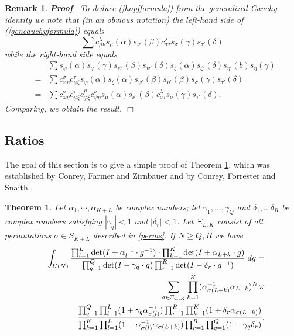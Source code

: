 \documentclass[11pt]{amsart}
\renewenvironment{proof}{
\noindent\textbf{Proof}\ }{\hspace*{\fill}
\begin{math}\Box\end{math}\medskip}
\newtheorem{theorem}{Theorem}
\newtheorem{varremark}{Remark}
\newenvironment{remark}{\begin{varremark}\em}{\em\end{varremark}}
\begin{document}
\begin{remark}
\begin{proof}
To deduce (\ref{hopfformula}) from the generalized Cauchy identity
we note that (in an obvious notation) the left-hand side of
(\ref{gencauchyformula}) equals
\[ \sum c_{\mu \nu}^{\lambda} s_{\mu} ( \alpha ) s_{\nu'} ( \beta )
    c^{\lambda}_{\sigma \tau} s_{\sigma} ( \gamma ) s_{\tau'} ( \delta ) \]
while the right-hand side equals
\begin{eqnarray*}
   &  & \sum s_{\varphi} ( \alpha ) s_{\varphi} ( \gamma ) s_{\psi'} ( \beta
   ) s_{\psi'} ( \delta ) s_{\xi} ( \alpha ) s_{\xi'} ( \delta ) s_{\eta'} (
   b ) s_{\eta} ( \gamma )_{}\\
   & = & \sum c_{\varphi \eta}^{\sigma} c^{\tau}_{\psi \xi} s_{\varphi} (
   \alpha ) s_{\xi} ( \alpha ) s_{\psi'} ( \beta ) s_{\eta'} ( \beta )
   s_{\sigma} ( \gamma ) s_{\tau'} ( \delta )\\
   & = & \sum c_{\varphi \eta}^{\sigma} c^{\tau}_{\psi \xi} c_{\varphi
   \xi}^{\mu} c_{\psi \eta}^{\nu} s_{\mu} ( \alpha ) s_{\nu'} ( \beta )
   c^{\lambda}_{\sigma \tau} s_{\sigma} ( \gamma ) s_{\tau'} ( \delta ) .
\end{eqnarray*}
Comparing, we obtain the result.
\end{proof}
\end{remark}


\subsection{Ratios}
The goal of this section is to give a simple proof of Theorem
\ref{t:1}, which was established by Conrey, Farmer and Zirnbauer
\cite{cfz} and by Conrey, Forrester and Snaith \cite{cfs}.

\begin{theorem} \label{t:1}
Let $\alpha_1, \cdots, \alpha_{K+L}$ be complex numbers; let
$\gamma_1, \dots, \gamma_Q$ and $\delta_1, \dots \delta_R$ be
complex numbers satisfying $|\gamma_q| < 1$ and $|\delta_r| < 1$.
Let $\Xi_{L, K}$ consist of all permutations $\sigma \in S_{K +
L}$ described in \eqref{perms}. If $N \geqslant Q, R$ we have
\begin{eqnarray}
   &  & \int_{U ( N )} \frac{\prod_{l = 1}^L \det ( I + \alpha_l^{- 1} \cdot
   g^{- 1} ) \cdot \prod_{k = 1}^K \det ( I + \alpha_{L + k} \cdot g
   )}{\prod_{q = 1}^Q \det ( I - \gamma_q \cdot g ) \prod_{r = 1}^R \det ( I
   - \delta_r \cdot g^{- 1} )} \hspace{0.25em} dg = \nonumber\\
   &  & \sum_{\sigma \in \Xi_{L, K}} \prod_{k = 1}^K ( \alpha_{\sigma ( L +
   k )}^{- 1} \alpha_{L + k} )^N \times \nonumber\\
   &  & \frac{\prod_{q = 1}^Q \prod_{l = 1}^L ( 1 + \gamma_q \alpha_{\sigma
   ( l )}^{- 1} ) \prod_{r = 1}^R \prod_{k = 1}^K ( 1 + \delta_r
   \alpha_{\sigma ( L + k )} )}{\prod_{k = 1}^K \prod_{l = 1}^L ( 1 -
   \alpha_{\sigma ( l )}^{- 1} \alpha_{\sigma ( L + k )} ) \prod_{r = 1}^R
   \prod_{q = 1}^Q ( 1 - \gamma_q \delta_r )} .  \label{unitaryratio}
\end{eqnarray}
\end{theorem}
\end{document}
